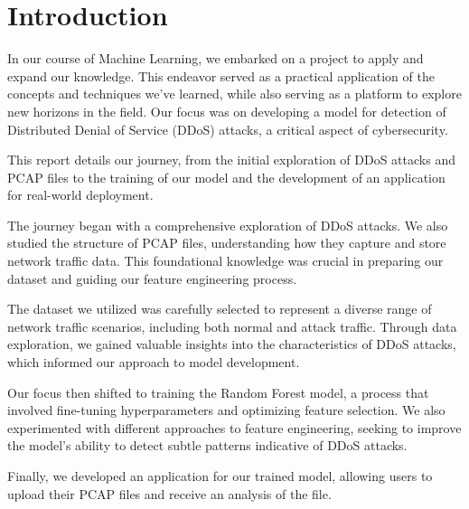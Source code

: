 \chapter*{Introduction}

\thispagestyle{empty}

In our course of Machine Learning, we embarked on a project to apply and expand our knowledge. This endeavor served as a practical application of the concepts and techniques we've learned, while also serving as a platform to explore new horizons in the field. 
Our focus was on developing a model for detection of Distributed Denial of Service (DDoS) attacks, a critical aspect of cybersecurity. 
 
This report details our journey, from the initial exploration of DDoS attacks and PCAP files to the training of our model and the development of an application for real-world deployment.

The journey began with a comprehensive exploration of DDoS attacks. We also studied the structure of PCAP files, understanding how they capture and store network traffic data. This foundational knowledge was crucial in preparing our dataset and guiding our feature engineering process.

The dataset we utilized was carefully selected to represent a diverse range of network traffic scenarios, including both normal and attack traffic. Through data exploration, we gained valuable insights into the characteristics of DDoS attacks, which informed our approach to model development.

Our focus then shifted to training the Random Forest model, a process that involved fine-tuning hyperparameters and optimizing feature selection. We also experimented with different approaches to feature engineering, seeking to improve the model's ability to detect subtle patterns indicative of DDoS attacks.

Finally, we developed an application for our trained model, allowing users to upload their PCAP files and receive an analysis of the file.


\pagestyle{default}